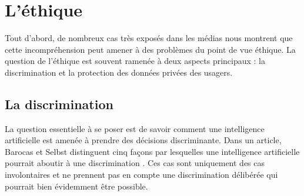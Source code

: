 \section{L'éthique}
Tout d'abord, de nombreux cas très exposés dans les médias nous montrent que cette incompréhension peut amener à des problèmes du point de vue éthique. La question de l'éthique est souvent ramenée à deux aspects principaux : la discrimination et la protection des données privées des usagers.
\subsection{La discrimination}
La question essentielle à se poser est de savoir comment une intelligence artificielle est amenée à prendre des décisions discriminante. Dans un article, Barocas et Selbst distinguent cinq façons par lesquelles une intelligence artificielle pourrait aboutir à une discrimination \cite{discriminationWay}. Ces cas sont uniquement des cas involontaires et ne prennent pas en compte une discrimination délibérée qui pourrait bien évidemment être possible.
